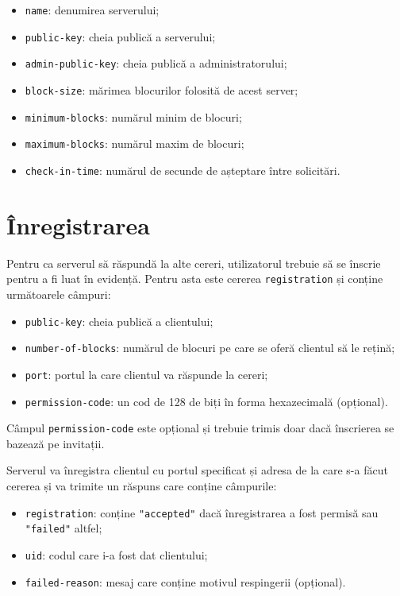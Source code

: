 \documentclass[a4wide,12pt]{report}
\newcommand{\cod}[1]{\texttt{#1}}
\newcommand{\acr}[1]{{\textsmaller[1]{\textsc{#1}}}} %
\begin{document}
\begin{itemize}
    \item \cod{name}: denumirea serverului;
    \item \cod{public-key}: cheia publică a serverului;
    \item \cod{admin-public-key}: cheia publică a administratorului;
    \item \cod{block-size}: mărimea blocurilor folosită de acest server;
    \item \cod{minimum-blocks}: numărul minim de blocuri;
    \item \cod{maximum-blocks}: numărul maxim de blocuri;
    \item \cod{check-in-time}: numărul de secunde de așteptare între solicitări.
\end{itemize}

\section{Înregistrarea} %

Pentru ca serverul să răspundă la alte cereri, utilizatorul trebuie să se înscrie pentru a fi luat în evidență. Pentru
asta este cererea \cod{registration} și conține următoarele câmpuri:

\begin{itemize}
    \item \cod{public-key}: cheia publică a clientului;
    \item \cod{number-of-blocks}: numărul de blocuri pe care se oferă clientul să le rețină;
    \item \cod{port}: portul la care clientul va răspunde la cereri;
    \item \cod{permission-code}: un cod de 128 de biți în forma hexazecimală (opțional).
\end{itemize}

Câmpul \cod{permission-code} este opțional și trebuie trimis doar dacă înscrierea se bazează pe invitații.

Serverul va înregistra clientul cu portul specificat și adresa \acr{IP} de la care s-a făcut cererea și va trimite un
răspuns care conține câmpurile:

\begin{itemize}
    \item \cod{registration}: conține \cod{"accepted"} dacă înregistrarea a fost permisă sau \cod{"failed"} altfel;
    \item \cod{uid}: codul care i-a fost dat clientului;
    \item \cod{failed-reason}: mesaj care conține motivul respingerii (opțional).
\end{itemize}
\end{document}

